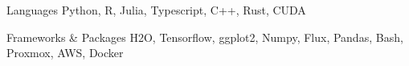 
\begin{cvskills}
  \cvskill
    {Languages} %
    {Python, R, Julia, Typescript, C++, Rust, CUDA} %

  \cvskill
    {Frameworks & Packages} %
    {H2O, Tensorflow, ggplot2, Numpy, Flux, Pandas, Bash, Proxmox, AWS, Docker} %
\end{cvskills}
